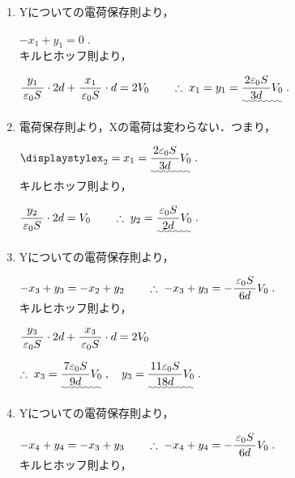﻿\documentclass[../../../ps_a.tex]{subfiles}
\begin{document}
    \begin{enumerate}
        \item Yについての電荷保存則より，
            
            \myspaceb%
            $\displaystyle%
                -x_1 + y_1 = 0 \;.
            $\\
            キルヒホッフ則より，
            
            \myspaceb%
            $\displaystyle%
                \myfracc{y_1}{\varepsilon_0 S} \cdot 2d%
                + \myfracc{x_1}{\varepsilon_0 S} \cdot d = 2V_0%
                \qquad \therefore \; x_1 = y_1%
                = \uwave{\myfracc{2\varepsilon_0 S}{3d} V_0} \;.
            $
        \item 電荷保存則より，Xの電荷は変わらない．つまり，
            
            \myspaceb%
            $\displaystyle%
                x_2 = x_1 = \uwave{\myfracc{2\varepsilon_0 S}{3d} V_0} \;.
            $\\
            キルヒホッフ則より，
            
            \myspaceb%
            $\displaystyle%
                \myfracc{y_2}{\varepsilon_0 S} \cdot 2d = V_0%
                \qquad \therefore \; y_2 = \uwave{\myfracc{\varepsilon_0 S}{2d} V_0} \;.
            $
        \item Yについての電荷保存則より，
            
            \myspaceb%
            $\displaystyle%
                -x_3 + y_3 = -x_2 + y_2%
                \qquad \therefore \; -x_3 + y_3 = -\myfracc{\varepsilon_0 S}{6d}V_0 \;.
            $\\
            キルヒホッフ則より，
            
            \myspaceb%
            $\displaystyle%
                \myfracc{y_3}{\varepsilon_0 S} \cdot 2d%
                + \myfracc{x_3}{\varepsilon_0 S} \cdot d = 2V_0
            $

            \myspaceb%
            $\displaystyle%
                \therefore \; x_3 = \uwave{\myfracc{7\varepsilon_0 S}{9d} V_0} \;,%
                \quad y_3 = \uwave{\myfracc{11\varepsilon_0 S}{18d} V_0} \;.
            $
        \item Yについての電荷保存則より，
            
            \myspaceb%
            $\displaystyle%
                -x_4 + y_4 = -x_3 + y_3%
                \qquad \therefore \; -x_4 + y_4 = -\myfracc{\varepsilon_0 S}{6d}V_0 \;.
            $\\
            キルヒホッフ則より，
            

\end{enumerate}
\end{document}
